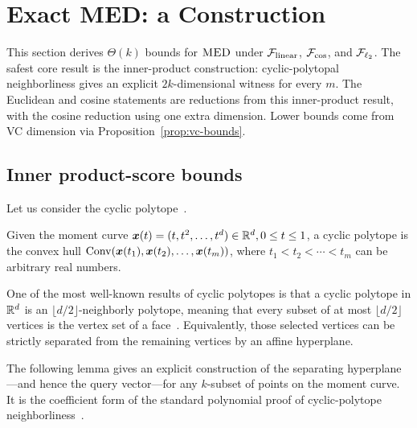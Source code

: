 \documentclass{article}
\begin{document}
\section{Exact MED: a Construction}\label{sec:optimal-standard-theory}

This section derives $\Theta(k)$ bounds for $\textsc{MED}$ under $\mathcal{F}_{\rm linear}$, $\mathcal{F}_{\cos}$, and $\mathcal{F}_{\ell_{2}}$.
The safest core result is the inner-product construction: cyclic-polytopal neighborliness gives an explicit $2k$-dimensional witness for every $m$. The Euclidean and cosine statements are reductions from this inner-product result, with the cosine reduction using one extra dimension. Lower bounds come from VC dimension via Proposition~\ref{prop:vc-bounds}.

\subsection{Inner product-score bounds}\label{sec:linear-bounds}
Let us consider the cyclic polytope~\citep{ziegler2012lectures}.
\begin{example}\label{eg:cyclic-polytope}
	Given the moment curve $\bm{x}(t) = (t, t^2, \dots, t^d)\in \mathbb{R}^d, 0\leq t\leq 1$, a cyclic polytope is the convex hull ${\rm Conv}(\bm{x}(t_1), \bm{x}(t_2), \dots, \bm{x}(t_m))$, where $t_1 < t_2 < \cdots < t_m$ can be arbitrary real numbers.
\end{example}
One of the most well-known results of cyclic polytopes is that a cyclic polytope in $\mathbb{R}^d$ is an $\lfloor d/2 \rfloor$-neighborly polytope, meaning that every subset of at most $\lfloor d/2 \rfloor$ vertices is the vertex set of a face~\citep{ziegler2012lectures}. Equivalently, those selected vertices can be strictly separated from the remaining vertices by an affine hyperplane.

The following lemma gives an explicit construction of the separating hyperplane---and hence the query vector---for any $k$-subset of points on the moment curve. It is the coefficient form of the standard polynomial proof of cyclic-polytope neighborliness~\citep{ziegler2012lectures,matousek2013lectures}.
\end{document}

